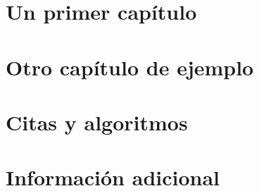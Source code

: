 \documentclass[12pt]{tesislcc}
\begin{document}
\tableofcontents

\mainmatter

\introduccion


\chapter{Un primer capítulo}


\chapter{Otro capítulo de ejemplo}


\chapter{Citas y algoritmos}



\conclusiones


\appendix

\chapter{Información adicional}


\listoffigures

\listoftables

\listofalgorithms

\listoflistings

\nocite{*}

\end{document}

